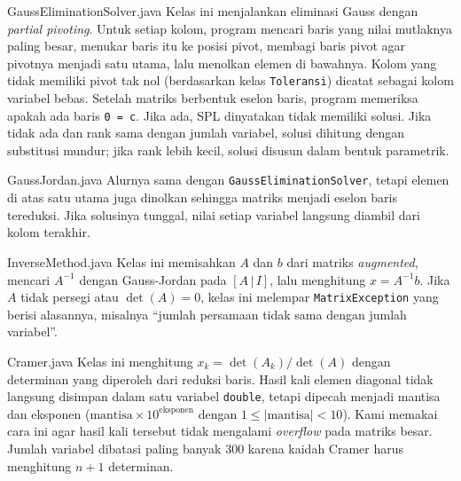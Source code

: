 \begin{kelas}{GaussEliminationSolver.java}
Kelas ini menjalankan eliminasi Gauss dengan \textit{partial pivoting}. Untuk setiap kolom, program mencari baris yang nilai mutlaknya paling besar, menukar baris itu ke posisi pivot, membagi baris pivot agar pivotnya menjadi satu utama, lalu menolkan elemen di bawahnya. Kolom yang tidak memiliki pivot tak nol (berdasarkan kelas \texttt{Toleransi}) dicatat sebagai kolom variabel bebas. Setelah matriks berbentuk eselon baris, program memeriksa apakah ada baris \texttt{0 = c}. Jika ada, SPL dinyatakan tidak memiliki solusi. Jika tidak ada dan rank sama dengan jumlah variabel, solusi dihitung dengan substitusi mundur; jika rank lebih kecil, solusi disusun dalam bentuk parametrik.
 
 
\end{kelas}

\begin{kelas}{GaussJordan.java}
Alurnya sama dengan \texttt{GaussEliminationSolver}, tetapi elemen di atas satu utama juga dinolkan sehingga matriks menjadi eselon baris tereduksi. Jika solusinya tunggal, nilai setiap variabel langsung diambil dari kolom terakhir.
\end{kelas}

\begin{kelas}{InverseMethod.java}
Kelas ini memisahkan $A$ dan $b$ dari matriks \textit{augmented}, mencari $A^{-1}$ dengan Gauss-Jordan pada $[A\,|\,I]$, lalu menghitung $x = A^{-1}b$. Jika $A$ tidak persegi atau $\det(A) = 0$, kelas ini melempar \texttt{MatrixException} yang berisi alasannya, misalnya ``jumlah persamaan tidak sama dengan jumlah variabel''.
 
\end{kelas}

\begin{kelas}{Cramer.java}
Kelas ini menghitung $x_k = \det(A_k)/\det(A)$ dengan determinan yang diperoleh dari reduksi baris. Hasil kali elemen diagonal tidak langsung disimpan dalam satu variabel \texttt{double}, tetapi dipecah menjadi mantisa dan eksponen ($\text{mantisa} \times 10^{\text{eksponen}}$ dengan $1 \le |\text{mantisa}| < 10$). Kami memakai cara ini agar hasil kali tersebut tidak mengalami \textit{overflow} pada matriks besar. Jumlah variabel dibatasi paling banyak 300 karena kaidah Cramer harus menghitung $n+1$ determinan.
 
\end{kelas}

